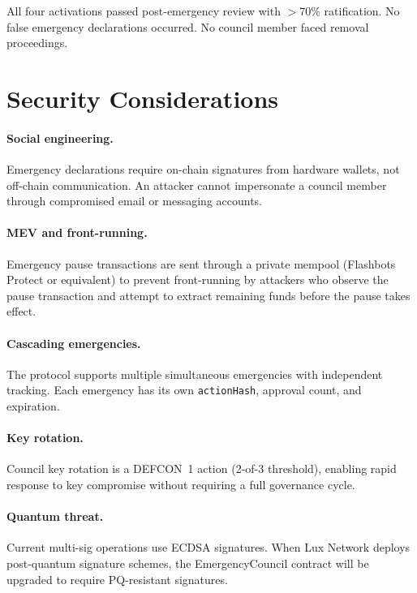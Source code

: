 \documentclass[11pt,letterpaper]{article}
\begin{document}
All four activations passed post-emergency review with $>$70\% ratification. No false emergency declarations occurred. No council member faced removal proceedings.

\section{Security Considerations}
\label{sec:security}

\paragraph{Social engineering.} Emergency declarations require on-chain signatures from hardware wallets, not off-chain communication. An attacker cannot impersonate a council member through compromised email or messaging accounts.

\paragraph{MEV and front-running.} Emergency pause transactions are sent through a private mempool (Flashbots Protect or equivalent) to prevent front-running by attackers who observe the pause transaction and attempt to extract remaining funds before the pause takes effect.

\paragraph{Cascading emergencies.} The protocol supports multiple simultaneous emergencies with independent tracking. Each emergency has its own \texttt{actionHash}, approval count, and expiration.

\paragraph{Key rotation.} Council key rotation is a DEFCON~1 action (2-of-3 threshold), enabling rapid response to key compromise without requiring a full governance cycle.

\paragraph{Quantum threat.} Current multi-sig operations use ECDSA signatures. When Lux Network deploys post-quantum signature schemes, the EmergencyCouncil contract will be upgraded to require PQ-resistant signatures.
\end{document}
